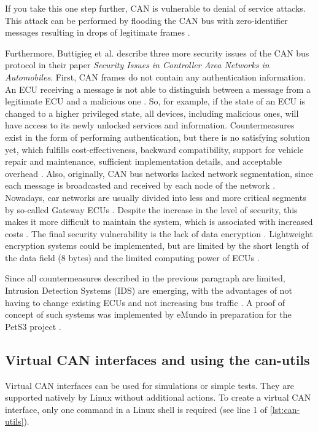 If you take this one step further, CAN is vulnerable to denial of service attacks. This attack can be performed by flooding the CAN bus with zero-identifier messages resulting in drops of legitimate frames \cite{Buttigieg2017}.

Furthermore, Buttigieg et al. \cite{Buttigieg2017} describe three more security issues of the CAN bus protocol in their paper \emph{Security Issues in Controller Area Networks in Automobiles}.
First, CAN frames do not contain any authentication information. An ECU receiving a message is not able to distinguish between a message from a legitimate ECU and a malicious one \cite{Buttigieg2017}. So, for example, if the state of an ECU is changed to a higher privileged state, all devices, including malicious ones, will have access to its newly unlocked services and information. Countermeasures exist in the form of performing authentication, but there is no satisfying solution yet, which fulfills cost-effectiveness, backward compatibility, support for vehicle repair and maintenance, sufficient implementation details, and acceptable overhead \cite{Bozdal2020}.
Also, originally, CAN bus networks lacked network segmentation, since each message is broadcasted and received by each node of the network \cite{Buttigieg2017}. Nowadays, car networks are usually divided into less and more critical segments by so-called Gateway ECUs \cite{Bozdal2020}. Despite the increase in the level of security, this makes it more difficult to maintain the system, which is associated with increased costs \cite{Bozdal2020}.
The final security vulnerability is the lack of data encryption \cite{Buttigieg2017}. Lightweight encryption systems could be implemented, but are limited by the short length of the data field (8 bytes) and the limited computing power of ECUs \cite{Bozdal2020}.

Since all countermeasures described in the previous paragraph are limited, Intrusion Detection Systems (IDS) are emerging, with the advantages of not having to change existing ECUs and not increasing bus traffic \cite{Bozdal2020}. A proof of concept of such systems was implemented by eMundo in preparation for the PetS3 project \cite{spahn2018}.

\subsection{Virtual CAN interfaces and using the can-utils}
\label{subsubsec:can-utils}

Virtual CAN interfaces can be used for simulations or simple tests. They are supported natively by Linux without additional actions.
To create a virtual CAN interface, only one command in a Linux shell is required (see line 1 of \autoref{lst:can-utils}).

